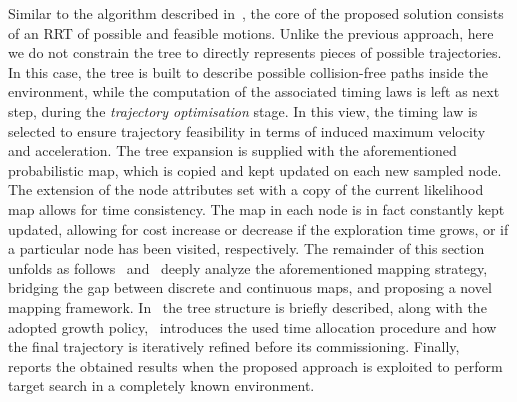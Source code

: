 Similar to the algorithm described in~, the core of the proposed solution consists of an RRT of
possible and feasible motions. Unlike the previous approach, here we do not constrain the tree to directly represents pieces of
possible trajectories. In this case, the tree is built to describe possible collision-free paths inside the environment, while the
computation of the associated timing laws is left as next step, during the \emph{trajectory optimisation} stage. In this view,
the timing law is selected to ensure trajectory feasibility in terms of induced maximum velocity and acceleration.
The tree expansion is supplied with the aforementioned probabilistic map, which is copied and kept updated on each new sampled
node. The extension of the node attributes set with a copy of the current likelihood map allows for time consistency.
The map in each node is in fact constantly kept updated, allowing for cost increase or decrease if the exploration time grows, or 
if a particular node has been visited, respectively.
The remainder of this section unfolds as follows~ and~
deeply analyze the aforementioned mapping strategy, bridging the gap between discrete and continuous maps, and proposing a novel
mapping framework. In~ the tree structure is briefly described, along with the adopted growth
policy,~ introduces the used time allocation procedure and how the final trajectory is iteratively
refined before its commissioning. Finally,~ reports the obtained results when the proposed
approach is exploited to perform target search in a completely known environment.

